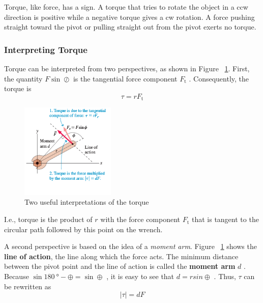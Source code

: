 Torque, like force, has a sign.  A torque that tries to rotate the
object in a ccw direction is positive while a negative torque gives a cw
rotation.  A force pushing straight toward the pivot or pulling straight
out from the pivot exerts no torque.

\subsubsection{Interpreting Torque}

Torque can be interpreted from two perspectives, as shown in Figure~%
\ref{fig:interpretations-of-torque}.  First, the quantity
$
    F\sin{\oslash}
$ is the tangential force component
$
    F_\mathrm{t}
$%
.  Consequently, the torque is
\begin{equation}
    \tau = rF_\mathrm{t}
\end{equation}

\begin{figure}
    \centering
    \includegraphics[width=0.4\textwidth]{../figures/interpretations-of-torque.png}
    \caption{Two useful interpretations of the torque}%
    \label{fig:interpretations-of-torque}
\end{figure}

I.e., torque is the product of
$
    r
$ with the force component
$
    F_\mathrm{t}
$ that is tangent to the circular path followed by this point on the
wrench.

A second perspective is based on the idea of a \emph{moment arm}.
Figure~%
\ref{fig:interpretations-of-torque} shows the \textbf{line of action},
the line along which the force acts.  The minimum distance between the
pivot point and the line of action is called the \textbf{moment arm}
$
    d
$%
.  Because
$
    \sin{\qty{180}{\degree} - \oplus} = \sin{\oplus}
$%
, it is easy to see that
$
    d=rsin\oplus
$%
.  Thus,
$
    \tau
$ can be rewritten as
\begin{equation}
    |\tau| = dF
\end{equation}


